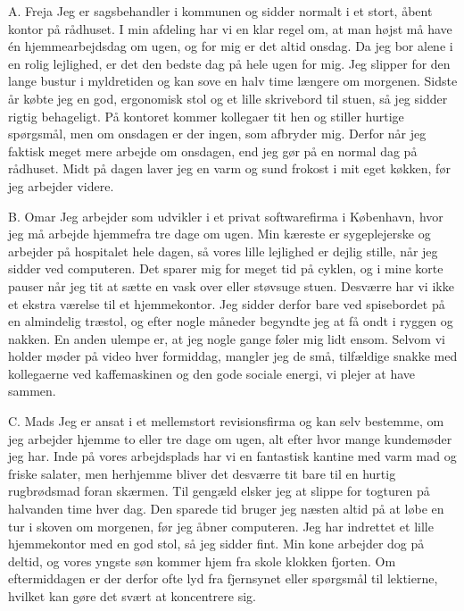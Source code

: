 \begin{emailbox}{A. Freja}
Jeg er sagsbehandler i kommunen og sidder normalt i et stort, åbent kontor på rådhuset. I min afdeling har vi en klar regel om, at man højst må have én hjemmearbejdsdag om ugen, og for mig er det altid onsdag. Da jeg bor alene i en rolig lejlighed, er det den bedste dag på hele ugen for mig. Jeg slipper for den lange bustur i myldretiden og kan sove en halv time længere om morgenen. Sidste år købte jeg en god, ergonomisk stol og et lille skrivebord til stuen, så jeg sidder rigtig behageligt. På kontoret kommer kollegaer tit hen og stiller hurtige spørgsmål, men om onsdagen er der ingen, som afbryder mig. Derfor når jeg faktisk meget mere arbejde om onsdagen, end jeg gør på en normal dag på rådhuset. Midt på dagen laver jeg en varm og sund frokost i mit eget køkken, før jeg arbejder videre.
\end{emailbox}

\begin{emailbox}{B. Omar}
Jeg arbejder som udvikler i et privat softwarefirma i København, hvor jeg må arbejde hjemmefra tre dage om ugen. Min kæreste er sygeplejerske og arbejder på hospitalet hele dagen, så vores lille lejlighed er dejlig stille, når jeg sidder ved computeren. Det sparer mig for meget tid på cyklen, og i mine korte pauser når jeg tit at sætte en vask over eller støvsuge stuen. Desværre har vi ikke et ekstra værelse til et hjemmekontor. Jeg sidder derfor bare ved spisebordet på en almindelig træstol, og efter nogle måneder begyndte jeg at få ondt i ryggen og nakken. En anden ulempe er, at jeg nogle gange føler mig lidt ensom. Selvom vi holder møder på video hver formiddag, mangler jeg de små, tilfældige snakke med kollegaerne ved kaffemaskinen og den gode sociale energi, vi plejer at have sammen.
\end{emailbox}

\begin{emailbox}{C. Mads}
Jeg er ansat i et mellemstort revisionsfirma og kan selv bestemme, om jeg arbejder hjemme to eller tre dage om ugen, alt efter hvor mange kundemøder jeg har. Inde på vores arbejdsplads har vi en fantastisk kantine med varm mad og friske salater, men herhjemme bliver det desværre tit bare til en hurtig rugbrødsmad foran skærmen. Til gengæld elsker jeg at slippe for togturen på halvanden time hver dag. Den sparede tid bruger jeg næsten altid på at løbe en tur i skoven om morgenen, før jeg åbner computeren. Jeg har indrettet et lille hjemmekontor med en god stol, så jeg sidder fint. Min kone arbejder dog på deltid, og vores yngste søn kommer hjem fra skole klokken fjorten. Om eftermiddagen er der derfor ofte lyd fra fjernsynet eller spørgsmål til lektierne, hvilket kan gøre det svært at koncentrere sig.
\end{emailbox}

